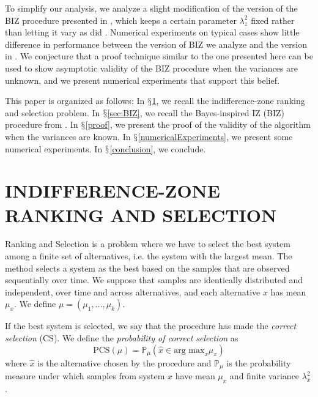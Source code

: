 \documentclass{wscpaperproc}
\theoremstyle{wsc}
\begin{document}
To simplify our analysis, we analyze a slight modification of the version of the BIZ procedure presented in , which keeps a certain parameter $\lambda^2_z$ fixed rather than letting it vary as did .  Numerical experiments on typical cases show little difference in performance between the version of BIZ we analyze and the version in .
We conjecture that a proof technique similar to the one presented here can be used to show asymptotic validity of the BIZ procedure when
the variances are unknown, and we present numerical experiments that support this belief. 


This paper is organized as follows: In $\mathsection$\ref{IZR}, we recall the
indifference-zone ranking and selection problem. In $\mathsection$\ref{sec:BIZ},
we recall the Bayes-inspired IZ (BIZ) procedure from . In $\mathsection$\ref{proof},
we present the proof of the validity of the algorithm when the variances
are known. In $\mathsection$\ref{numericalExperiments}, we present some numerical experiments. 
In $\mathsection$\ref{conclusion}, we conclude.



\section{INDIFFERENCE-ZONE RANKING AND SELECTION}
\label{IZR}

Ranking and Selection is a problem where we have to select the best system
among a finite set of alternatives, i.e. the system with the largest
mean. The method selects a system as the best based on the samples
that are observed sequentially over time. We suppose that samples
are identically distributed and independent, over time and across alternatives, and
each alternative $x$ has mean $\mu_{x}$. We define $\mu=(\mu_{1},\ldots,\mu_{k})$.

If the best system is selected, we say that the procedure has made the \emph{correct selection}
(CS). We define the \emph{probability of correct selection} as 
\[
\mbox{PCS}\left(\mu\right)=\mathbb{P}_{\mu}\left(\hat{x}\in\mbox{arg max}_{x}\mu_{x}\right)
\]
where $\hat{x}$ is the alternative chosen by the procedure and $\mathbb{P}_{\mu}$
is the probability measure under which samples from system $x$ have
mean $\mu_{x}$ and finite variance $\lambda_{x}^{2}$.
\end{document}
